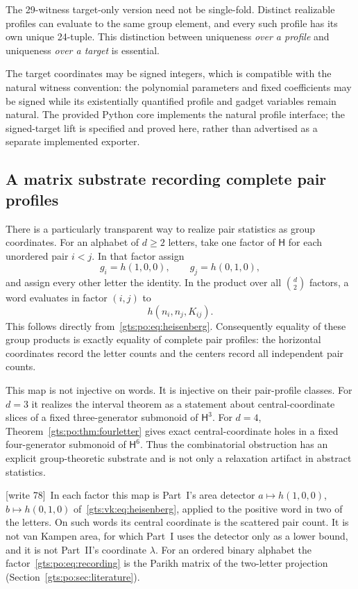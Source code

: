 \documentclass[11pt,letterpaper]{article}
\theoremstyle{definition}
\theoremstyle{remark}
\newcommand{\HH}{\mathsf H}
\newcommand{\wtagb}{\textup{[write 78]}}
\begin{document}
The 29-witness target-only version need not be single-fold. Distinct realizable profiles can evaluate to the same group element, and every such profile has its own unique 24-tuple. This distinction between uniqueness \emph{over a profile} and uniqueness \emph{over a target} is essential.

The target coordinates may be signed integers, which is compatible with the natural witness convention: the polynomial parameters and fixed coefficients may be signed while its existentially quantified profile and gadget variables remain natural. The provided Python core implements the natural profile interface; the signed-target lift is specified and proved here, rather than advertised as a separate implemented exporter.

\subsection{A matrix substrate recording complete pair profiles}
There is a particularly transparent way to realize pair statistics as group coordinates. For an alphabet of $d\ge2$ letters, take one factor of $\HH$ for each unordered pair $i<j$. In that factor assign
\[
 g_i=h(1,0,0),\qquad g_j=h(0,1,0),
\]
and assign every other letter the identity. In the product over all $\binom d2$ factors, a word evaluates in factor $(i,j)$ to
\begin{equation}\label{gts:po:eq:recording}
 h(n_i,n_j,K_{ij}).
\end{equation}
This follows directly from~\eqref{gts:po:eq:heisenberg}. Consequently equality of these group products is exactly equality of complete pair profiles: the horizontal coordinates record the letter counts and the centers record all independent pair counts.

This map is not injective on words. It is injective on their pair-profile classes. For $d=3$ it realizes the interval theorem as a statement about central-coordinate slices of a fixed three-generator submonoid of $\HH^3$. For $d=4$, Theorem~\ref{gts:po:thm:fourletter} gives exact central-coordinate holes in a fixed four-generator submonoid of $\HH^6$. Thus the combinatorial obstruction has an explicit group-theoretic substrate and is not only a relaxation artifact in abstract statistics.

\wtagb\ In each factor this map is Part~I's area detector $a\mapsto h(1,0,0)$, $b\mapsto h(0,1,0)$ of~\eqref{gts:vk:eq:heisenberg}, applied to the positive word in two of the letters. On such words its central coordinate is the scattered pair count. It is not van Kampen area, for which Part~I uses the detector only as a lower bound, and it is not Part~II's coordinate $\lambda$. For an ordered binary alphabet the factor~\eqref{gts:po:eq:recording} is the Parikh matrix of the two-letter projection (Section~\ref{gts:po:sec:literature}).
\end{document}

